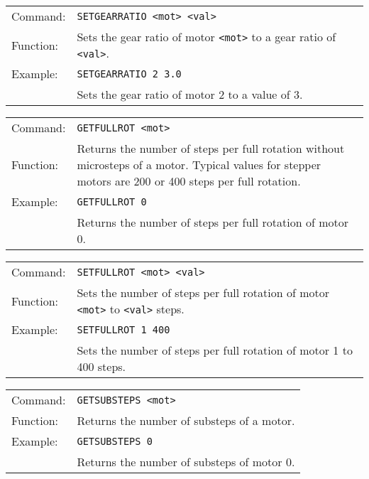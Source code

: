 \vspace{\vdistace}

\begin{table}[h]
  \begin{tabularx}{\textwidth}{lX}
    Command:  & \texttt{SETGEARRATIO <mot> <val>}\\
    Function: & Sets the gear ratio of motor \texttt{<mot>} to a gear ratio
                of \texttt{<val>}.\\
    Example:  & \texttt{SETGEARRATIO 2 3.0}\\
              & Sets the gear ratio of motor 2 to a value of 3.
  \end{tabularx}
\end{table}

\vspace{\vdistace}

\begin{table}[h]
  \begin{tabularx}{\textwidth}{lX}
    Command:  & \texttt{GETFULLROT <mot>}\\
    Function: & Returns the number of steps per full rotation without microsteps of a motor. Typical values for stepper motors are 200 or 400 steps per full rotation.\\
    Example:  & \texttt{GETFULLROT 0}\\
              & Returns the number of steps per full rotation of motor 0.
  \end{tabularx}
\end{table}

\vspace{\vdistace}

\begin{table}[h]
  \begin{tabularx}{\textwidth}{lX}
    Command:  & \texttt{SETFULLROT <mot> <val>}\\
    Function: & Sets the number of steps per full rotation of motor \texttt{<mot>} to \texttt{<val>} steps.\\
    Example:  & \texttt{SETFULLROT 1 400}\\
              & Sets the number of steps per full rotation of motor 1 to 400 steps.
  \end{tabularx}
\end{table}

\vspace{\vdistace}

\begin{table}[h]
  \begin{tabularx}{\textwidth}{lX}
    Command:  & \texttt{GETSUBSTEPS <mot>}\\
    Function: & Returns the number of substeps of a motor.\\
    Example:  & \texttt{GETSUBSTEPS 0}\\
              & Returns the number of substeps of motor 0.
  \end{tabularx}
\end{table}

